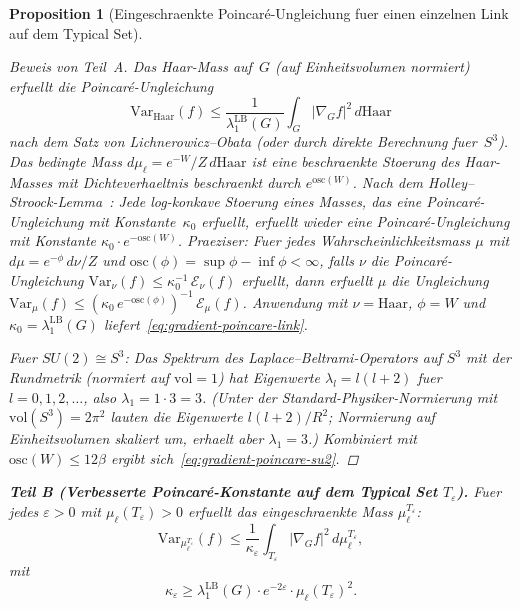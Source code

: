 \documentclass[12pt,a4paper]{article}
\theoremstyle{definition}
\theoremstyle{plain}
\newtheorem{proposition}[definition]{Proposition}
\theoremstyle{remark}
\begin{document}
\begin{proposition}[Eingeschraenkte Poincar\'e-Ungleichung fuer einen einzelnen Link auf dem Typical Set]
\begin{proof}[Beweis von Teil~A]
Das Haar-Mass auf~$G$ (auf Einheitsvolumen normiert) erfuellt die Poincar\'e-Ungleichung
\[
    \mathrm{Var}_{\mathrm{Haar}}(f) \leq \frac{1}{\lambda_1^{\mathrm{LB}}(G)} \int_G |\nabla_G f|^2\,d\mathrm{Haar}
\]
nach dem Satz von Lichnerowicz--Obata (oder durch direkte Berechnung fuer~$S^3$). Das bedingte Mass $d\mu_\ell = e^{-W}/Z\,d\mathrm{Haar}$ ist eine beschraenkte Stoerung des Haar-Masses mit Dichteverhaeltnis beschraenkt durch $e^{\mathrm{osc}(W)}$. Nach dem Holley--Stroock-Lemma~\cite{HolleyStroock1987}: Jede log-konkave Stoerung eines Masses, das eine Poincar\'e-Ungleichung mit Konstante~$\kappa_0$ erfuellt, erfuellt wieder eine Poincar\'e-Ungleichung mit Konstante $\kappa_0\cdot e^{-\mathrm{osc}(W)}$. Praeziser: Fuer jedes Wahrscheinlichkeitsmass $\mu$ mit $d\mu = e^{-\phi}\,d\nu / Z$ und $\mathrm{osc}(\phi) = \sup\phi - \inf\phi < \infty$, falls $\nu$ die Poincar\'e-Ungleichung $\mathrm{Var}_\nu(f) \leq \kappa_0^{-1}\,\mathcal{E}_\nu(f)$ erfuellt, dann erfuellt $\mu$ die Ungleichung $\mathrm{Var}_\mu(f) \leq (\kappa_0\,e^{-\mathrm{osc}(\phi)})^{-1}\,\mathcal{E}_\mu(f)$. Anwendung mit $\nu = \mathrm{Haar}$, $\phi = W$ und $\kappa_0 = \lambda_1^{\mathrm{LB}}(G)$ liefert~\eqref{eq:gradient-poincare-link}.

Fuer $SU(2) \cong S^3$: Das Spektrum des Laplace--Beltrami-Operators auf $S^3$ mit der Rundmetrik (normiert auf $\mathrm{vol} = 1$) hat Eigenwerte $\lambda_l = l(l+2)$ fuer $l = 0, 1, 2, \ldots$, also $\lambda_1 = 1 \cdot 3 = 3$. (Unter der Standard-Physiker-Normierung mit $\mathrm{vol}(S^3) = 2\pi^2$ lauten die Eigenwerte $l(l+2)/R^2$; Normierung auf Einheitsvolumen skaliert um, erhaelt aber $\lambda_1 = 3$.) Kombiniert mit $\mathrm{osc}(W) \leq 12\beta$ ergibt sich~\eqref{eq:gradient-poincare-su2}.
\end{proof}

\medskip
\noindent\textbf{Teil B (Verbesserte Poincar\'e-Konstante auf dem Typical Set $T_\varepsilon$).}
Fuer jedes $\varepsilon > 0$ mit $\mu_\ell(T_\varepsilon) > 0$ erfuellt das eingeschraenkte Mass $\mu_\ell^{T_\varepsilon}$:
\begin{equation}\label{eq:restricted-poincare}
    \mathrm{Var}_{\mu_\ell^{T_\varepsilon}}(f) \leq \frac{1}{\kappa_\varepsilon}\int_{T_\varepsilon} |\nabla_G f|^2\,d\mu_\ell^{T_\varepsilon},
\end{equation}
mit
\begin{equation}\label{eq:restricted-constant}
    \kappa_\varepsilon \geq \lambda_1^{\mathrm{LB}}(G)\cdot e^{-2\varepsilon}\cdot \mu_\ell(T_\varepsilon)^2.
\end{equation}


\end{proposition}
\end{document}
